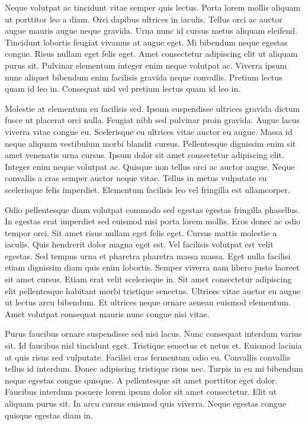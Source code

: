 \documentclass[11pt,a4paper]{article}
\begin{document}
Neque volutpat ac tincidunt vitae semper quis lectus. Porta lorem mollis aliquam ut porttitor leo a diam. Orci dapibus ultrices in iaculis. Tellus orci ac auctor augue mauris augue neque gravida. Urna nunc id cursus metus aliquam eleifend. Tincidunt lobortis feugiat vivamus at augue eget. Mi bibendum neque egestas congue. Risus nullam eget felis eget. Amet consectetur adipiscing elit ut aliquam purus sit. Pulvinar elementum integer enim neque volutpat ac. Viverra ipsum nunc aliquet bibendum enim facilisis gravida neque convallis. Pretium lectus quam id leo in. Consequat nisl vel pretium lectus quam id leo in.

Molestie at elementum eu facilisis sed. Ipsum suspendisse ultrices gravida dictum fusce ut placerat orci nulla. Feugiat nibh sed pulvinar proin gravida. Augue lacus viverra vitae congue eu. Scelerisque eu ultrices vitae auctor eu augue. Massa id neque aliquam vestibulum morbi blandit cursus. Pellentesque dignissim enim sit amet venenatis urna cursus. Ipsum dolor sit amet consectetur adipiscing elit. Integer enim neque volutpat ac. Quisque non tellus orci ac auctor augue. Neque convallis a cras semper auctor neque vitae. Tellus in metus vulputate eu scelerisque felis imperdiet. Elementum facilisis leo vel fringilla est ullamcorper.

Odio pellentesque diam volutpat commodo sed egestas egestas fringilla phasellus. In egestas erat imperdiet sed euismod nisi porta lorem mollis. Eros donec ac odio tempor orci. Sit amet risus nullam eget felis eget. Cursus mattis molestie a iaculis. Quis hendrerit dolor magna eget est. Vel facilisis volutpat est velit egestas. Sed tempus urna et pharetra pharetra massa massa. Eget nulla facilisi etiam dignissim diam quis enim lobortis. Semper viverra nam libero justo laoreet sit amet cursus. Etiam erat velit scelerisque in. Sit amet consectetur adipiscing elit pellentesque habitant morbi tristique senectus. Ultrices vitae auctor eu augue ut lectus arcu bibendum. Et ultrices neque ornare aenean euismod elementum. Amet volutpat consequat mauris nunc congue nisi vitae.

Purus faucibus ornare suspendisse sed nisi lacus. Nunc consequat interdum varius sit. Id faucibus nisl tincidunt eget. Tristique senectus et netus et. Euismod lacinia at quis risus sed vulputate. Facilisi cras fermentum odio eu. Convallis convallis tellus id interdum. Donec adipiscing tristique risus nec. Turpis in eu mi bibendum neque egestas congue quisque. A pellentesque sit amet porttitor eget dolor. Faucibus interdum posuere lorem ipsum dolor sit amet consectetur. Elit ut aliquam purus sit. In arcu cursus euismod quis viverra. Neque egestas congue quisque egestas diam in.
\end{document}
